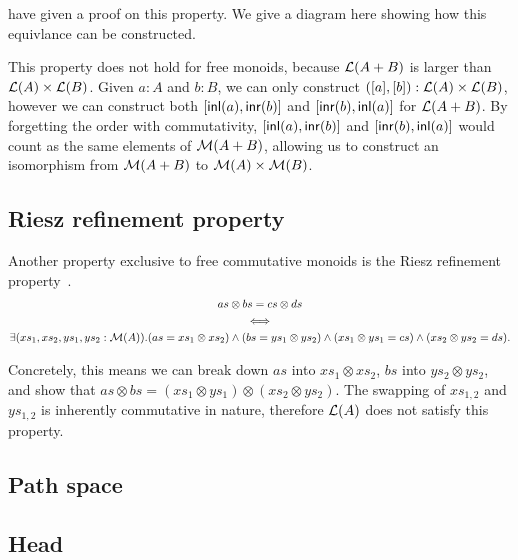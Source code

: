 \cite{choudhuryFreeCommutativeMonoids2023} have given a proof on this property. We give a diagram here
showing how this equivlance can be constructed.

\begin{center}
\end{center}

This property does not hold for free monoids, because $\mathcal{L}(A + B)$ is larger than $\mathcal{L}(A) \times \mathcal{L}(B)$.
Given $a: A$ and $b: B$, we can only construct $([a], [b]) : \mathcal{L}(A) \times \mathcal{L}(B)$, however we can
construct both $[\operatorname{\mathsf{inl}}(a), \operatorname{\mathsf{inr}}(b)]$ and $[\operatorname{\mathsf{inr}}(b), \operatorname{\mathsf{inl}}(a)]$ for $\mathcal{L}(A + B)$.
By forgetting the order with commutativity,
$[\operatorname{\mathsf{inl}}(a), \operatorname{\mathsf{inr}}(b)]$ and $[\operatorname{\mathsf{inr}}(b), \operatorname{\mathsf{inl}}(a)]$ would count as the same elements
of $\mathcal{M}(A + B)$, allowing us to construct an isomorphism from $\mathcal{M}(A + B)$ to $\mathcal{M}(A) \times \mathcal{M}(B)$.

\subsection{Riesz refinement property}
Another property exclusive to free commutative monoids is the Riesz refinement
property~\cite{dobbertinRefinementMonoidsVaught1983}.
\begin{equation*}
\begin{gathered}
    as \otimes bs = cs \otimes ds \\
    \iff \\
    \exists (xs_{1}, xs_{2}, ys_{1}, ys_{2} : \mathcal{M}(A)).
    (as = xs_{1} \otimes xs_{2}) \land (bs = ys_{1} \otimes ys_{2}) \land
    (xs_{1} \otimes ys_{1} = cs) \land (xs_{2} \otimes ys_{2} = ds).
\end{gathered}
\end{equation*}

Concretely, this means we can break down $as$ into $xs_1 \otimes xs_2$,
$bs$ into $ys_2 \otimes ys_2$, and show that $as \otimes bs = (xs_1 \otimes ys_1) \otimes (xs_2 \otimes ys_2)$.
The swapping of $xs_{1,2}$ and $ys_{1,2}$ is inherently commutative in nature,
therefore $\mathcal{L}(A)$ does not satisfy this property.

\subsection{Path space}

\subsection{Head}

